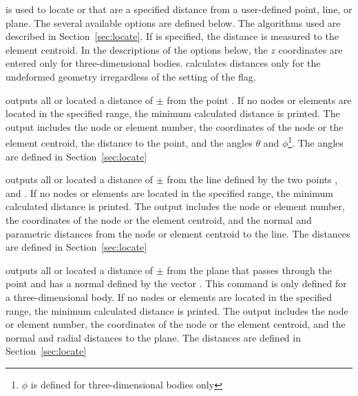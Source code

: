  {
 is used to locate  or  that are a
specified distance from a user-defined point, line, or plane.  The
several available options are defined below.  The algorithms used are
described in Section~\ref{sec:locate}.  If  is specified,
the distance is measured to the element centroid.  In the descriptions
of the  options below, the $z$ coordinates are entered only
for three-dimensional bodies.   calculates distances only
for the undeformed geometry irregardless of the setting of the
 flag. 

 {
outputs all  or  located a
distance of $\pm$ from the
point .  If no nodes or elements are
located in the specified range, the minimum calculated distance
is printed.  The output includes the node or element number, the
coordinates of the node or the element centroid, the distance to the
point, and the angles $\theta$ and $\phi$\footnote{$\phi$ is defined for
three-dimensional bodies only}.  The angles are defined in
Section~\ref{sec:locate} 
}

 {
outputs all  or  located a distance of
$\pm$ from the line defined by the two
points , and . If
no nodes or elements are located in the specified range, the minimum
calculated distance is printed.  The output includes the node or element
number, the coordinates of the node or the element centroid, and the
normal and parametric distances from the node or element centroid to the
line.  The distances are defined in Section~\ref{sec:locate} 
}

 {
outputs all  or  located a 
distance of $\pm$ from the plane that
passes through the point  and has a normal
defined by the vector . This command is only
defined for a three-dimensional body.  If no nodes or elements are
located in the specified range, the minimum calculated distance is
printed.  The output includes the node or element number, the
coordinates of the node or the element centroid, and the normal and
radial distances to the plane.  The distances are defined in
Section~\ref{sec:locate} 
}
}

